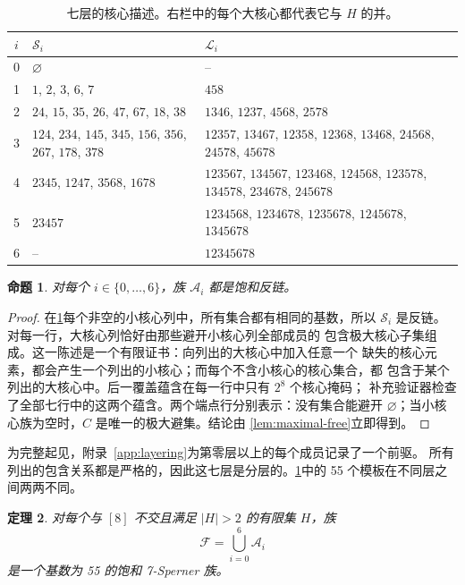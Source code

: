 \documentclass[UTF8,11pt,a4paper,fontset=fandol]{ctexart}
\newtheorem{theorem}{定理}[section]
\newtheorem{proposition}[theorem]{命题}
\theoremstyle{definition}
\theoremstyle{remark}
\newcommand{\family}{\mathcal{F}}
\newcommand{\smallcores}{\mathcal{S}}
\newcommand{\largecores}{\mathcal{L}}
\begin{document}
\begin{table}[htbp]
\centering
\small
\setlength{\tabcolsep}{4pt}
\renewcommand{\arraystretch}{1.18}
\begin{tabular}{c p{} p{}}
\toprule
$i$ & $\smallcores_i$ & $\largecores_i$ \\
\midrule
0 & $\varnothing$ & -- \\
1 & $1$, $2$, $3$, $6$, $7$ & $458$ \\
2 & $24$, $15$, $35$, $26$, $47$, $67$, $18$, $38$
  & $1346$, $1237$, $4568$, $2578$ \\
3 & $124$, $234$, $145$, $345$, $156$, $356$, $267$, $178$, $378$
  & $12357$, $13467$, $12358$, $12368$, $13468$, $24568$, $24578$, $45678$ \\
4 & $2345$, $1247$, $3568$, $1678$
  & $123567$, $134567$, $123468$, $124568$, $123578$, $134578$, $234678$, $245678$ \\
5 & $23457$
  & $1234568$, $1234678$, $1235678$, $1245678$, $1345678$ \\
6 & -- & $12345678$ \\
\bottomrule
\end{tabular}
\caption{七层的核心描述。右栏中的每个大核心都代表它与 $H$ 的并。}
\label{tab:layers}
\end{table}

\begin{proposition}
\label{prop:layer-certificate}
对每个 $i\in\{0,\ldots,6\}$，族 $\mathcal A_i$ 都是饱和反链。
\end{proposition}

\begin{proof}
在\cref{tab:layers}每个非空的小核心列中，所有集合都有相同的基数，所以
$\smallcores_i$ 是反链。对每一行，大核心列恰好由那些避开小核心列全部成员的
包含极大核心子集组成。这一陈述是一个有限证书：向列出的大核心中加入任意一个
缺失的核心元素，都会产生一个列出的小核心；而每个不含小核心的核心集合，都
包含于某个列出的大核心中。后一覆盖蕴含在每一行中只有 $2^8$ 个核心掩码；
补充验证器检查了全部七行中的这两个蕴含。两个端点行分别表示：没有集合能避开
$\varnothing$；当小核心族为空时，$C$ 是唯一的极大避集。结论由
\cref{lem:maximal-free}立即得到。
\end{proof}

为完整起见，附录~\ref{app:layering}为第零层以上的每个成员记录了一个前驱。
所有列出的包含关系都是严格的，因此这七层是分层的。\cref{tab:layers}中的
55 个模板在不同层之间两两不同。

\begin{theorem}
\label{thm:size55}
对每个与 $[8]$ 不交且满足 $|H|>2$ 的有限集 $H$，族
\[
  \family=\bigcup_{i=0}^{6}\mathcal A_i
\]
是一个基数为 55 的饱和 7-Sperner 族。
\end{theorem}
\end{document}
